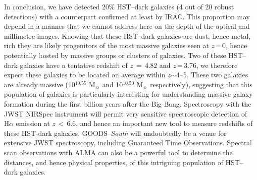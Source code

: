 \documentclass[longauth]{aa}
\begin{document}
In conclusion, we have detected 20\% HST--dark galaxies (4 out of 20 robust detections) with a counterpart confirmed at least by IRAC. This proportion may depend in a manner that we cannot address here on the depth of the optical and millimetre images. 
Knowing that these HST--dark galaxies are dust, hence metal, rich they are likely progenitors of the most massive galaxies seen at $z$\,=\,0, hence potentially hosted by massive groups or clusters of galaxies. Two of these HST--dark galaxies have a tentative redshift of $z\,=\,$4.82 and $z$\,=\,3.76, we therefore expect these galaxies to be located on average within $z$$\sim$4--5. These two galaxies are already massive (10$^{10.55}$ M$_\sun$ and 10$^{10.50}$ M$_\sun$ respectively), suggesting that this population of galaxies is particularly interesting for understanding massive galaxy formation during the first billion years after the Big Bang. Spectroscopy with the JWST NIRSpec instrument will permit very sensitive spectroscopic detection of H$\alpha$ emission at $z\,<\,$6.6, and hence an important new tool to measure redshifts of these HST-dark galaxies. GOODS--\textit{South} will undoubtedly be a venue for extensive JWST spectroscopy, including Guaranteed Time Observations. Spectral scan observations with ALMA can also be a powerful tool to determine the distances, and hence physical properties, of this intriguing population of HST--dark galaxies.
\end{document}

